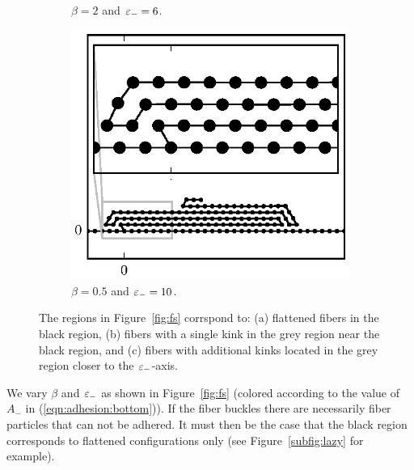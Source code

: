 \begin{figure}[h!]
\begin{subfigure}{.5\textwidth}
			\caption{$\beta=2$ and $\varepsilon_-=6$.\label{subfig:lazy_loop}}
		\end{subfigure}

		\begin{subfigure}{.5\textwidth}
			\centering
			\includegraphics{./fig/ch3/fs/b0.5_eb10.eps}
			\caption{$\beta=0.5$ and $\varepsilon_-=10$.\label{subfig:lazy_many_loops}}
		\end{subfigure}		
		\caption{The regions in Figure~\ref{fig:fs} corrspond to: (a) flattened fibers in the black region, (b) fibers with a single kink in the grey region near the black region, and (c) fibers with additional kinks located in the grey region closer to the $\varepsilon_-$-axis.\label{fig:lazy}}	
	\end{figure}

We vary $\beta$ and $\varepsilon_-$ as shown in Figure~\ref{fig:fs} (colored according to the value of $A_-$ in (\ref{eqn:adhesion:bottom})). If the fiber buckles there are necessarily fiber particles that can not be adhered. It must then be the case that the black region corresponds to flattened configurations only (see Figure~\ref{subfig:lazy} for example). 

